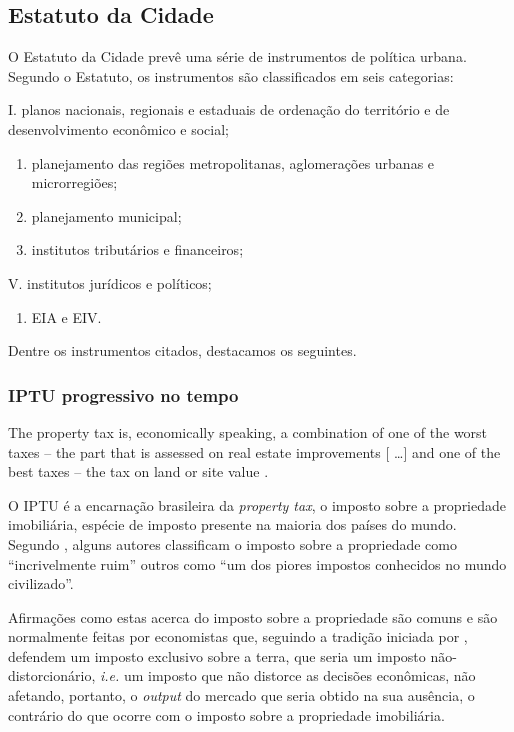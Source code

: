 \documentclass[
	12pt,				%
	oneside,			%
	a4paper,			%
	chapter=TITLE,		%
	section=TITLE,		%
	english,			%
	brazil				%
	]{abntex2}
\begin{document}
\begin{refsection}
{\subsection{Estatuto da Cidade}\label{estatuto-da-cidade}}

O Estatuto da Cidade \autocite{cidade} prevê uma série de instrumentos de política
urbana. Segundo o Estatuto, os instrumentos são classificados em seis
categorias:

I. planos nacionais, regionais e estaduais de ordenação do território e de
desenvolvimento econômico e social;
\begin{enumerate}
\def\labelenumi{\Roman{enumi}.}
\setcounter{enumi}{1}
\item
  planejamento das regiões metropolitanas, aglomerações urbanas e
  microrregiões;
\item
  planejamento municipal;
\item
  institutos tributários e financeiros;
\end{enumerate}
V. institutos jurídicos e políticos;
\begin{enumerate}
\def\labelenumi{\Roman{enumi}.}
\setcounter{enumi}{5}
\tightlist
\item
  \gls{EIA} e \gls{EIV}.
\end{enumerate}
Dentre os instrumentos citados, destacamos os seguintes.

\hypertarget{iptu-progressivo-no-tempo}{%
\subsubsection{IPTU progressivo no tempo}\label{iptu-progressivo-no-tempo}}
\begin{citacao}
The property tax is, economically speaking, a combination of one of the worst
taxes -- the part that is assessed on real estate improvements [ \ldots] and one
of the best taxes -- the tax on land or site value .
\end{citacao}
O \gls{IPTU} é a encarnação brasileira da \emph{property tax}, o imposto sobre a
propriedade imobiliária, espécie de imposto presente na maioria dos países do
mundo. Segundo \textcite[p.~101]{spinney}, alguns autores classificam o imposto sobre a
propriedade como ``incrivelmente ruim'' outros como ``um dos piores impostos
conhecidos no mundo civilizado''.

Afirmações como estas acerca do imposto sobre a propriedade são comuns e são
normalmente feitas por economistas que, seguindo a tradição iniciada por
\textcite{henrygeorge}, defendem um imposto exclusivo sobre a terra, que seria um imposto
não-distorcionário, \emph{i.e.} um imposto que não distorce as decisões econômicas,
não afetando, portanto, o \emph{output} do mercado que seria obtido na sua ausência,
o contrário do que ocorre com o imposto sobre a propriedade imobiliária.


\end{refsection}
\end{document}
